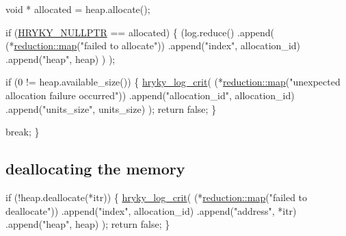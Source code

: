 \begin{DoxyCodeInclude}
                \textcolor{keywordtype}{void} * allocated = heap.allocate();

                \textcolor{keywordflow}{if} (\hyperlink{common_8h_a4cd4ac09cfcdbd6b30ee69afc156e210}{HRYKY_NULLPTR} == allocated) \{
                    (log.reduce()
                     .append(
                         (*\hyperlink{namespacehryky_1_1reduction_ac5eae270cf8047b294dc4ff3e5e11a79}{reduction::map}(\textcolor{stringliteral}{"failed to allocate"}))
                         .append(\textcolor{stringliteral}{"index"}, allocation\_id)
                         .append(\textcolor{stringliteral}{"heap"}, heap)
                         )
                     );

                    \textcolor{keywordflow}{if} (0 != heap.available\_size()) \{
                        \hyperlink{log__writer__common_8h_a61bcce4d8e91e6fde78ce1be7d9ceac8}{hryky_log_crit}(
                            (*\hyperlink{namespacehryky_1_1reduction_ac5eae270cf8047b294dc4ff3e5e11a79}{reduction::map}(\textcolor{stringliteral}{"unexpected allocation failure
       occurred"}))
                            .append(\textcolor{stringliteral}{"allocation\_id"}, allocation\_id)
                            .append(\textcolor{stringliteral}{"units\_size"}, units\_size)
                            );
                        \textcolor{keywordflow}{return} \textcolor{keyword}{false};
                    \}
                    
                    \textcolor{keywordflow}{break};
                \}

\end{DoxyCodeInclude}
\hypertarget{hryky_1_1memory_deallocation}{}\subsection{deallocating the memory}\label{hryky_1_1memory_deallocation}

\begin{DoxyCodeInclude}
                \textcolor{keywordflow}{if} (!heap.deallocate(*itr)) \{
                    \hyperlink{log__writer__common_8h_a61bcce4d8e91e6fde78ce1be7d9ceac8}{hryky_log_crit}(
                        (*\hyperlink{namespacehryky_1_1reduction_ac5eae270cf8047b294dc4ff3e5e11a79}{reduction::map}(\textcolor{stringliteral}{"failed to deallocate"}))
                        .append(\textcolor{stringliteral}{"index"},    allocation\_id)
                        .append(\textcolor{stringliteral}{"address"},  *itr)
                        .append(\textcolor{stringliteral}{"heap"},     heap)
                        );
                    \textcolor{keywordflow}{return} \textcolor{keyword}{false};
                \}

\end{DoxyCodeInclude}
 